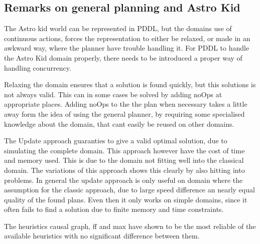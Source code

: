\subsection{Remarks on general planning and Astro Kid}
	The Astro kid world can be represented in PDDL, but the domains use of continuous actions, forces the representation to either be relaxed, or made in an awkward way, where the planner have trouble handling it. For PDDL to handle the Astro Kid domain properly, there needs to be introduced a proper way of handling concurrency.

	Relaxing the domain ensures that a solution is found quickly, but this solutions is not always valid. This can in some cases be solved by adding noOps at appropriate places. Adding noOps to the the plan when necessary takes a little away form the idea of using the general planner, by requiring some specialised knowledge about the domain, that cant easily be reused on other domains.
	
	The Update approach guaranties to give a valid optimal solution, due to simulating the complete domain. This approach however have the cost of time and memory used. This is due to the domain not fitting well into the classical domain. The variations of this approach shows this clearly by also hitting into problems. In general the update approach is only useful on domain where the assumption for the classic approach, due to large speed difference an nearly equal quality of the found plans. Even then it only works on simple domains, since it often fails to find a solution due to finite memory and time constraints.
	
	The heuristics causal graph, ff and max have shown to be the most reliable of the available heuristics with no significant difference between them.
	
